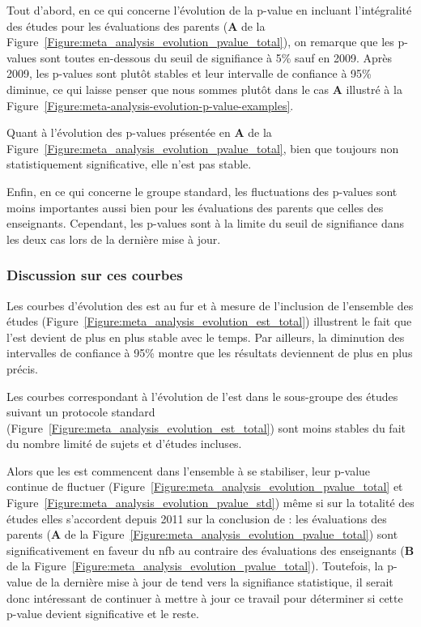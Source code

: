 Tout d'abord, en ce qui concerne l'évolution de la p-value en incluant l'intégralité des études pour les 
évaluations des parents (\textbf{A} de la Figure~\ref{Figure:meta_analysis_evolution_pvalue_total}), on remarque que les p-values sont toutes
en-dessous du seuil de signifiance à 5\% sauf en 2009. Après 2009, les p-values sont plutôt stables et leur intervalle de confiance à 95\% diminue, ce qui laisse 
penser que nous sommes plutôt dans le cas \textbf{A} illustré à la Figure~\ref{Figure:meta-analysis-evolution-p-value-examples}.

Quant à l'évolution des p-values présentée en \textbf{A} de la Figure~\ref{Figure:meta_analysis_evolution_pvalue_total}, bien que toujours non statistiquement significative, 
elle n'est pas stable.

Enfin, en ce qui concerne le groupe standard, les fluctuations des p-values sont moins importantes aussi bien pour les évaluations des parents que celles des enseignants. 
Cependant, les p-values sont à la limite du seuil de signifiance dans les deux cas lors de la dernière mise à jour.

\subsubsection{Discussion sur ces courbes}

Les courbes d'évolution des \gls{est} au fur et à mesure de l'inclusion de l'ensemble des études (Figure~\ref{Figure:meta_analysis_evolution_est_total}) illustrent le fait que l'\gls{est} 
devient de plus en plus stable avec le temps. Par ailleurs, la diminution des intervalles de confiance à 95\% montre que les résultats deviennent de plus en plus précis.

Les courbes correspondant à l'évolution de l'\gls{est} dans le sous-groupe des études suivant un protocole standard (Figure~\ref{Figure:meta_analysis_evolution_est_total}) sont moins stables 
du fait du nombre limité de sujets et d'études incluses.

Alors que les \gls{est} commencent dans l'ensemble à se stabiliser, leur p-value continue de fluctuer (Figure~\ref{Figure:meta_analysis_evolution_pvalue_total} et 
Figure~\ref{Figure:meta_analysis_evolution_pvalue_std}) même si sur la totalité des études elles s'accordent depuis 2011 sur la conclusion de \citet{Cortese2016} :
les évaluations des parents (\textbf{A} de la Figure~\ref{Figure:meta_analysis_evolution_pvalue_total}) sont significativement en faveur du \gls{nfb} 
au contraire des évaluations des enseignants (\textbf{B} de la Figure~\ref{Figure:meta_analysis_evolution_pvalue_total}). 
Toutefois, la p-value de la dernière mise à jour de \citet{Cortese2016} tend vers la signifiance statistique, il serait donc intéressant de continuer à mettre à jour ce travail pour déterminer si 
cette p-value devient significative et le reste.

